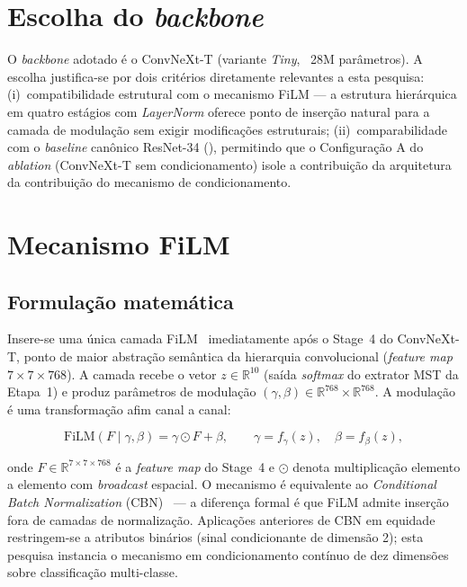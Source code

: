 \section{Escolha do \emph{backbone}}
\label{sec:backbone}

O \emph{backbone} adotado é o ConvNeXt-T (variante \emph{Tiny}, ~28M parâmetros). A escolha justifica-se por dois critérios diretamente relevantes a esta pesquisa: (i)~compatibilidade estrutural com o mecanismo FiLM --- a estrutura hierárquica em quatro estágios com \emph{LayerNorm} oferece ponto de inserção natural para a camada de modulação sem exigir modificações estruturais; (ii)~comparabilidade com o \emph{baseline} canônico ResNet-34 (), permitindo que o Configuração A do \emph{ablation} (ConvNeXt-T sem condicionamento) isole a contribuição da arquitetura da contribuição do mecanismo de condicionamento.

\section{Mecanismo FiLM}
\label{sec:film}

\subsection{Formulação matemática}

Insere-se uma única camada FiLM~\cite{perez2018film} imediatamente após o Stage~4 do ConvNeXt-T, ponto de maior abstração semântica da hierarquia convolucional (\emph{feature map} $7 \times 7 \times 768$). A camada recebe o vetor $z \in \mathbb{R}^{10}$ (saída \emph{softmax} do extrator MST da Etapa~1) e produz parâmetros de modulação $(\gamma, \beta) \in \mathbb{R}^{768} \times \mathbb{R}^{768}$. A modulação é uma transformação afim canal a canal:

\begin{equation}
\mathrm{FiLM}(F \mid \gamma, \beta) = \gamma \odot F + \beta,
\qquad
\gamma = f_\gamma(z), \quad \beta = f_\beta(z),
\label{eq:film}
\end{equation}

onde $F \in \mathbb{R}^{7 \times 7 \times 768}$ é a \emph{feature map} do Stage~4 e $\odot$ denota multiplicação elemento a elemento com \emph{broadcast} espacial. O mecanismo é equivalente ao \emph{Conditional Batch Normalization} (CBN)~\cite{devries2017modulating} --- a diferença formal é que FiLM admite inserção fora de camadas de normalização. Aplicações anteriores de CBN em equidade restringem-se a atributos binários (sinal condicionante de dimensão 2); esta pesquisa instancia o mecanismo em condicionamento contínuo de dez dimensões sobre classificação multi-classe.


